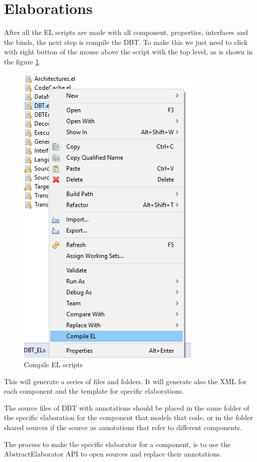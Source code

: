 \documentclass[11pt]{report}
\begin{document}
	\section{Elaborations}
	
	After all the EL scripts are made with all component, properties, interfaces and the binds, the next step is compile the DBT. To make this we just need to click with right button of the mouse above the script with the top level, as is shown in the figure \ref{fig:compileel}.
	
	\begin{figure} [H]
		\centering
		\includegraphics[width=0.4\linewidth]{Images/compileEL}
		\caption{Compile EL scripts}
		\label{fig:compileel}
	\end{figure}
	
	This will generate a series of files and folders. It will generate also the XML for each component and the template for specific elaborations.
	
	The source files of DBT with annotations should be placed in the same folder of the specific elaboration for the component that models that code, or in the folder shared sources if the source as annotations that refer to different components. 
	
	The process to make the specific elaborator for a component, is to use the AbstractElaborator API to open sources and replace their annotations.
	
\end{document}
